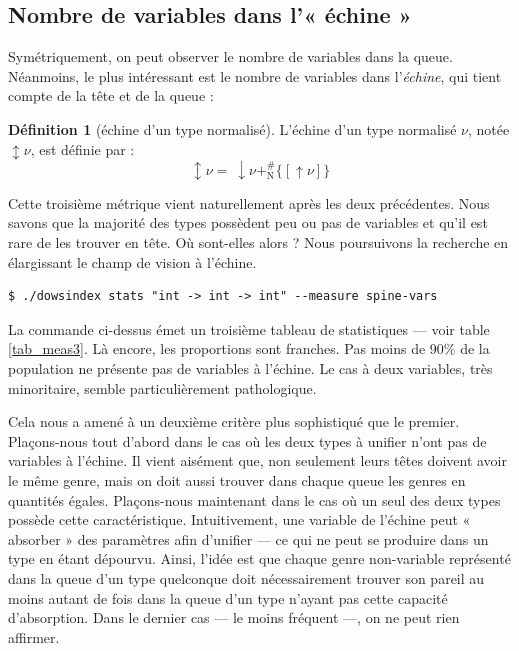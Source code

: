 \documentclass[a4paper]{report}
\theoremstyle{definition}
\newtheorem{definition}[theoreme]{Définition}
\newcommand{\mset}[1]{\{\![#1]\!\}}
\newcommand{\N}{\mathrm{N}}
\begin{document}

\subsection{Nombre de variables dans l'« échine »}

Symétriquement, on peut observer le nombre de variables dans la queue. Néanmoins, le plus intéressant est le nombre de variables dans l'\emph{échine}, qui tient compte de la tête et de la queue :

\begin{definition}[échine d'un type normalisé]
  L'échine d'un type normalisé $\nu$, notée $\updownarrow \nu$, est définie par :
  \[ \updownarrow \nu =\ \downarrow \nu +^\#_\N \mset{\uparrow \nu} \]
\end{definition}

Cette troisième métrique vient naturellement après les deux précédentes. Nous savons que la majorité des types possèdent peu ou pas de variables et qu'il est rare de les trouver en tête. Où sont-elles alors ? Nous poursuivons la recherche en élargissant le champ de vision à l'échine.

\begin{verbatim}
$ ./dowsindex stats "int -> int -> int" --measure spine-vars
\end{verbatim}

La commande ci-dessus émet un troisième tableau de statistiques — voir table \ref{tab_meas3}. Là encore, les proportions sont franches. Pas moins de 90\% de la population ne présente pas de variables à l'échine. Le cas à deux variables, très minoritaire, semble particulièrement pathologique.

Cela nous a amené à un deuxième critère plus sophistiqué que le premier. Plaçons-nous tout d'abord dans le cas où les deux types à unifier n'ont pas de variables à l'échine. Il vient aisément que, non seulement leurs têtes doivent avoir le même genre, mais on doit aussi trouver dans chaque queue les genres en quantités égales. Plaçons-nous maintenant dans le cas où un seul des deux types possède cette caractéristique. Intuitivement, une variable de l'échine peut « absorber » des paramètres afin d'unifier — ce qui ne peut se produire dans un type en étant dépourvu. Ainsi, l'idée est que chaque genre non-variable représenté dans la queue d'un type quelconque doit nécessairement trouver son pareil au moins autant de fois dans la queue d'un type n'ayant pas cette capacité d'absorption. Dans le dernier cas — le moins fréquent —, on ne peut rien affirmer.
\end{document}
